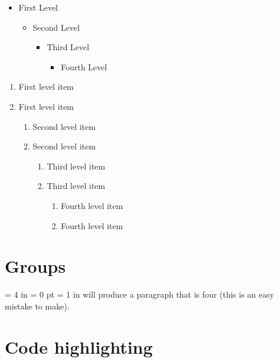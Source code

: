 \documentclass[12pt,letterpaper,titlepage]{report}
\begin{document}
\begin{itemize}
	\item  First Level
	      \begin{itemize}
		      \item  Second Level
		            \begin{itemize}
			            \item  Third Level
			                  \begin{itemize}
				                  \item  Fourth Level
			                  \end{itemize}
		            \end{itemize}
	      \end{itemize}
\end{itemize}
\begin{enumerate}
	\item First level item
	\item First level item
	      \begin{enumerate}
		      \item Second level item
		      \item Second level item
		            \begin{enumerate}
			            \item Third level item
			            \item Third level item
			                  \begin{enumerate}
				                  \item Fourth level item
				                  \item Fourth level item
			                  \end{enumerate}
		            \end{enumerate}
	      \end{enumerate}
\end{enumerate}

\section{Groups}
 {
  \hsize = 4 in
  \parindent = 0 pt
  \leftskip = 1 in
  will produce a paragraph that is four
  (this is an easy mistake to make).
  \par
 }


\section{Code highlighting}
\end{document}
